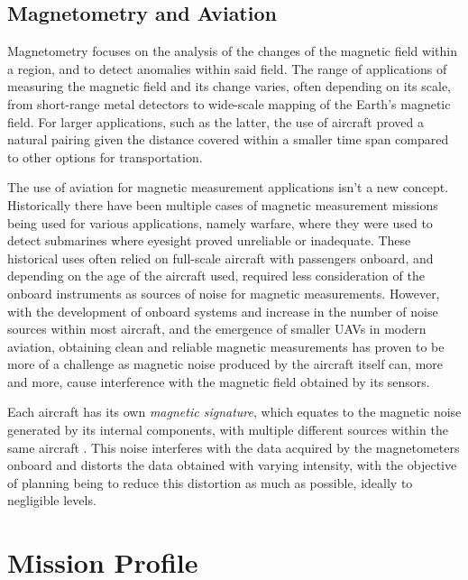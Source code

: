 \documentclass[english,fira]{ist-report}
\begin{document}
\section{Magnetometry and Aviation}

Magnetometry focuses on the analysis of the changes of the magnetic field within a region, and to detect anomalies within said field. The range of applications of measuring the magnetic field and its change varies, often depending on its scale, from short-range metal detectors to wide-scale mapping of the Earth's magnetic field. For larger applications, such as the latter, the use of aircraft proved a natural pairing given the distance covered within a smaller time span compared to other options for transportation.

The use of aviation for magnetic measurement applications isn't a new concept. Historically there have been multiple cases of magnetic measurement missions being used for various applications, namely warfare, where they were used to detect submarines where eyesight proved unreliable or inadequate. These historical uses often relied on full-scale aircraft with passengers onboard, and depending on the age of the aircraft used, required less consideration of the onboard instruments as sources of noise for magnetic measurements. However, with the development of onboard systems and increase in the number of noise sources within most aircraft, and the emergence of smaller UAVs in modern aviation, obtaining clean and reliable magnetic measurements has proven to be more of a challenge as magnetic noise produced by the aircraft itself can, more and more, cause interference with the magnetic field obtained by its sensors.

Each aircraft has its own \textit{magnetic signature}, which equates to the magnetic noise generated by its internal components, with multiple different sources within the same aircraft \cite{mag_thesis}. This noise interferes with the data acquired by the magnetometers onboard and distorts the data obtained with varying intensity, with the objective of planning being to reduce this distortion as much as possible, ideally to negligible levels.

\chapter{Mission Profile} \label{chap:missionprofile}
\end{document}
